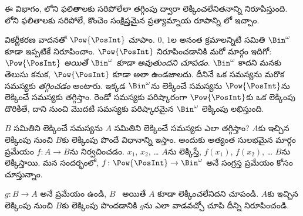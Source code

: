 \documentclass[../../../include/open-logic-section]{subfiles}
\begin{document}


\begin{editorial}
  ఈ విభాగం, లోని ఫలితాలకు సరిపోలేలా తగ్గింపు ద్వారా
  లెక్కించలేనితనాన్ని నిరూపిస్తుంది. లోని ఫలితాలకు
  సరిపోలే, కొంచెం సంక్షిప్తమైన ప్రత్యామ్నాయ రూపాన్ని
  లో ఇచ్చాం.
\end{editorial}

వికర్ణీకరణ వాదనతో $\Pow{\PosInt}$  చూపాం.
$0$, $1$ల అనంత క్రమాలన్నిటి సమితి $\Bin^\omega$ కూడా
 ఇప్పటికే నిరూపించాం. $\Pow{\PosInt}$
 నిరూపించడానికి మరో మార్గం ఇదిగో:
\emph{$\Pow{\PosInt}$  అయితే $\Bin^\omega$ కూడా
   అవుతుందని చూపడం}. $\Bin^\omega$ 
కాదని మనకు తెలుసు కనుక, $\Pow{\PosInt}$ కూడా అలా ఉండజాలదు.
దీనినే ఒక సమస్యను మరొక సమస్యకు \emph{తగ్గించడం} అంటారు. ఇక్కడ
$\Bin^\omega$ను లెక్కించే సమస్యను $\Pow{\PosInt}$ను లెక్కించే
సమస్యకు తగ్గిస్తాం. రెండో సమస్యకు పరిష్కారంగా $\Pow{\PosInt}$కు ఒక
లెక్కింపు దొరికితే, దాని నుంచి మొదటి సమస్యకు పరిష్కారమైన $\Bin^\omega$
లెక్కింపు లభిస్తుంది.

$B$ సమితిని లెక్కించే సమస్యను $A$ సమితిని లెక్కించే సమస్యకు ఎలా
తగ్గిస్తాం? $A$కు ఇచ్చిన లెక్కింపు నుంచి $B$కు లెక్కింపు పొందే
విధానాన్ని ఇస్తాం. అందుకు అత్యంత సులభమైన మార్గం 
ప్రమేయం $f\colon A \to B$ను నిర్వచించడం. $x_1$, $x_2$, \dots{}
$A$ను లెక్కిస్తే, $f(x_1)$, $f(x_2)$, \dots{} $B$ను లెక్కిస్తాయి.
మన సందర్భంలో, $f\colon \Pow{\PosInt} \to \Bin^\omega$ అనే సంగ్రస్త
ప్రమేయం కోసం చూస్తున్నాం.

\begin{prob}
$g\colon B \to A$ అనే  ప్రమేయం ఉండి, $B$~
అయితే $A$ కూడా లెక్కించలేనిదని చూపండి. $A$కు ఇచ్చిన లెక్కింపు నుంచి
$B$కు లెక్కింపు పొందడానికి $g$ను ఎలా వాడవచ్చో చూపి దీన్ని
నిరూపించండి.
\end{prob}
\end{document}
